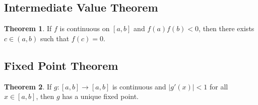 \documentclass[11pt]{article}
\theoremstyle{definition}
\newtheorem{theorem}{Theorem}[section]
\begin{document}
\subsection{Intermediate Value Theorem}
\begin{theorem}
If $f$ is continuous on $[a,b]$ and $f(a)f(b) < 0$, then there exists $c \in (a,b)$ such that $f(c) = 0$.
\end{theorem}

\subsection{Fixed Point Theorem}
\begin{theorem}
If $g: [a,b] \to [a,b]$ is continuous and $|g'(x)| < 1$ for all $x \in [a,b]$, then $g$ has a unique fixed point.
\end{theorem}
\end{document}
